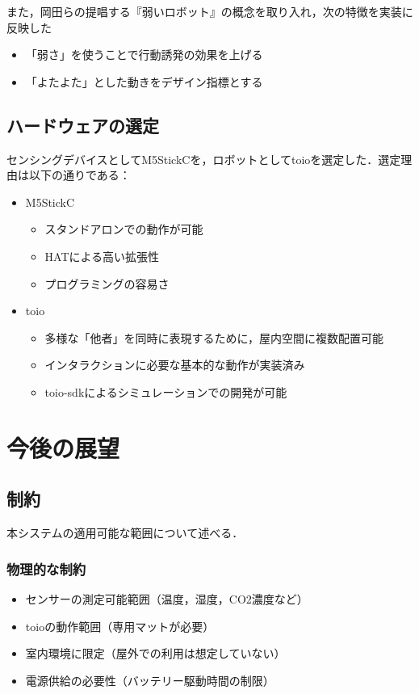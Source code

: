 \documentclass[paper=a4paper,jafontsize=9pt,head_space=15mm,gutter=20mm,
twocolumn,number_of_lines=49, line_length=26zw]{myuarticle}
\begin{document}
また，岡田ら\cite{岡田-2017-弱いロボ}の提唱する『弱いロボット』の概念を取り入れ，次の特徴を実装に反映した
\begin{itemize}
  \item 「弱さ」を使うことで行動誘発の効果を上げる
  \item 「よたよた」とした動きをデザイン指標とする
\end{itemize}

\subsection{ハードウェアの選定}
センシングデバイスとしてM5StickCを，ロボットとしてtoioを選定した．選定理由は以下の通りである：

\begin{itemize}
  \item M5StickC
    \begin{itemize}
      \item スタンドアロンでの動作が可能
      \item HATによる高い拡張性
      \item プログラミングの容易さ
    \end{itemize}

  \item toio
    \begin{itemize}
      \item 多様な「他者」を同時に表現するために，屋内空間に複数配置可能
      \item インタラクションに必要な基本的な動作が実装済み
      \item toio-sdkによるシミュレーションでの開発が可能
    \end{itemize}
\end{itemize}

\section{今後の展望}

\subsection{制約}
本システムの適用可能な範囲について述べる．

\subsubsection{物理的な制約}
\begin{itemize}
  \item センサーの測定可能範囲（温度，湿度，CO2濃度など）
  \item toioの動作範囲（専用マットが必要）
  \item 室内環境に限定（屋外での利用は想定していない）
  \item 電源供給の必要性（バッテリー駆動時間の制限）
\end{itemize}
\end{document}
